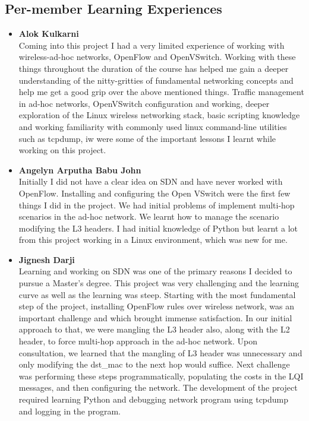 \documentclass{article}
\begin{document}
\subsection{Per-member Learning Experiences}
\begin{itemize}
\item \textbf{Alok Kulkarni} \\Coming into this project I had a very limited experience of working with wireless-ad-hoc networks, OpenFlow and
OpenVSwitch. Working with these things throughout the duration of the course has helped me gain a deeper understanding
of the nitty-gritties of fundamental networking concepts and help me get a good grip over the above mentioned things.
Traffic management in ad-hoc networks, OpenVSwitch configuration and working, deeper exploration of the Linux wireless
networking stack, basic scripting knowledge and working familiarity with commonly used linux command-line utilities such
as tcpdump, iw were some of the important lessons I learnt while working on this project.
\item \textbf{Angelyn Arputha Babu John} \\Initially I did not have a clear idea on SDN and have never worked with
OpenFlow. Installing and configuring the Open VSwitch were the first few things I did in the project. We had initial
problems of implement multi-hop scenarios in the ad-hoc network. We learnt how to manage the scenario modifying the L3
headers. I had initial knowledge of Python but learnt a lot from this project working in a Linux environment, which was
new for me.
\item \textbf{Jignesh Darji} \\Learning and working on SDN was one of the primary reasons I decided to pursue a Master’s
degree. This project was very challenging and the learning curve as well as the learning was steep. Starting with the
most fundamental step of the project, installing OpenFlow rules over wireless network, was an important challenge and
which brought immense satisfaction. In our initial approach to that, we were mangling the L3 header also, along with the
L2 header, to force multi-hop approach in the ad-hoc network. Upon consultation, we learned that the mangling of L3
header was unnecessary and only modifying the dst\_mac to the next hop would suffice. Next challenge was performing these
steps programmatically, populating the costs in the LQI messages, and then configuring the network. The development of
the project required learning Python and debugging network program using tcpdump and logging in the program.  

\end{itemize}
\end{document}
